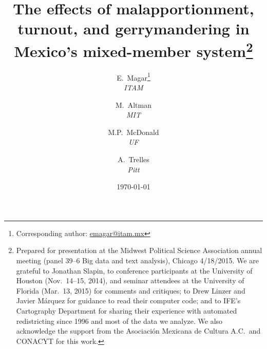 \documentclass[letter,12pt]{article}
\begin{document}
\title{The effects of malapportionment, turnout, and gerrymandering in Mexico's mixed-member system\thanks{Prepared for presentation at the Midwest Political Science Association annual meeting (panel 39--6 Big data and text analysis), Chicago 4/18/2015. We are grateful to Jonathan Slapin, to conference participants at the University of Houston (Nov.~14--15, 2014), and seminar attendees at the University of Florida (Mar.~13, 2015) for comments and critiques; to Drew Linzer and Javier M\'arquez for guidance to read their computer code; and to IFE's Cartography Department for sharing their experience with automated redistricting since 1996 and most of the data we analyze. We also acknowledge the support from the Asociaci\'on Mexicana de Cultura A.C.\ and CONACYT for this work.}}
\author{E.~Magar\footnote{Corresponding author: \url{emagar@itam.mx}} \\ \emph{ITAM} \and
        M.~Altman \\ \emph{MIT} \and
        M.P.~McDonald \\ \emph{UF} \and  
        A.~Trelles \\ \emph{Pitt}
      }
\date{\today}
\maketitle


\end{document}
